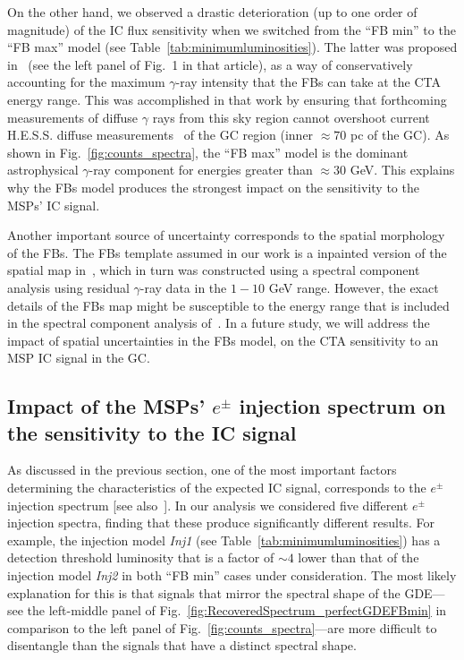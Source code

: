 \documentclass[doublespace,draft,nopageskip]{VTthesis} %
\begin{document}
On the other hand, we observed a drastic deterioration (up to one order of magnitude) of the IC flux  sensitivity when we switched from the ``FB min'' to the ``FB max'' model (see Table~\ref{tab:minimumluminosities}). 
The latter was proposed in~\cite{Rinchiuso:2020skh} (see the left panel of Fig.~1 in that article), as a way of conservatively accounting for the maximum $\gamma$-ray intensity that the FBs can take at the CTA energy range. This was accomplished in that work by ensuring that forthcoming measurements of diffuse $\gamma$ rays from this sky region cannot overshoot current H.E.S.S. diffuse measurements~\citep{Abramowski:2016mir} of the GC region (inner $\approx 70$ pc of the GC). As shown in Fig.~\ref{fig:counts_spectra}, the ``FB max'' model is the dominant astrophysical $\gamma$-ray component for energies greater than $\approx 30$ GeV. This explains why the FBs model produces the strongest impact on the sensitivity to the MSPs' IC signal.

Another important source of uncertainty corresponds to the spatial morphology of the FBs. The FBs template assumed in our work is a inpainted version of the spatial map in~\cite{TheFermi-LAT:2017vmf}, which in turn was constructed using a spectral component analysis using residual $\gamma$-ray data in the $1-10$ GeV range. However, the exact details of the FBs map might be susceptible to the energy range that is included in the spectral component analysis of~\cite{TheFermi-LAT:2017vmf}. In a future study, we will address the impact of spatial uncertainties in the FBs model, on the CTA sensitivity to an MSP IC signal in the GC.  

\subsection{Impact of the MSPs' $e^\pm$ injection spectrum on the sensitivity to the IC signal}

As discussed in the previous section, one of the most important factors determining the characteristics of the expected IC signal, corresponds to the $e^\pm$ injection spectrum [see also~\citep{Song:2019nrx}]. In our analysis we  considered five different $e^\pm$ injection spectra, finding that these produce significantly different results. For example, the injection model \textit{Inj1} (see Table~\ref{tab:minimumluminosities}) has a detection threshold luminosity that is a factor of $\sim 4$
lower than that of the injection model \textit{Inj2} in both ``FB min'' cases under consideration. The most likely explanation for this is that signals that mirror the spectral shape of the GDE---see the left-middle panel of Fig.~\ref{fig:RecoveredSpectrum_perfectGDEFBmin} in comparison to the left panel of Fig.~\ref{fig:counts_spectra}---are more difficult
to disentangle than the signals that have a distinct spectral shape.
\end{document}

